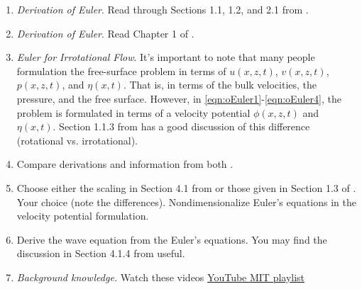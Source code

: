 \documentclass[a4paper,reqno]{article}
\begin{document}
\begin{itemize}
\begin{enumerate}
                \item \emph{Derivation of Euler}. Read through Sections 1.1, 1.2, and 2.1 from \cite{chorin1990mathematical}.   
                \item \emph{Derivation of Euler}. Read Chapter 1 of \cite{johnson1997modern}.
                \item \emph{Euler for Irrotational Flow}.  It's important to note that many people formulation the free-surface problem in terms of $u(x,z,t)$, $v(x,z,t)$, $p(x,z,t)$, and $\eta(x,t)$.  That is, in terms of the bulk velocities, the pressure, and the free surface.  However, in \eqref{eqn:oEuler1}-\eqref{eqn:oEuler4}, the problem is formulated in terms of a velocity potential $\phi(x,z,t)$ and $\eta(x,t)$.  Section 1.1.3 from \cite{johnson1997modern} has a good discussion of this difference (rotational vs. irrotational).
                \item Compare derivations and information from both \cite{chorin1990mathematical,johnson1997modern}.
                \item Choose either the scaling in Section 4.1 from \cite{deconinckNotes} or those given in Section 1.3 of \cite{johnson1997modern}.  Your choice (note the differences).  Nondimensionalize Euler's equations in the velocity potential formulation.
                \item Derive the wave equation from the Euler's equations.  You may find the discussion in Section 4.1.4 from \cite{deconinckNotes} useful.
                \item \emph{Background knowledge.} Watch these videos \href{https://www.youtube.com/playlist?list=PLfF--3o8i4r82vJ0kjCVYgqKgyVM5QwN0}{YouTube MIT playlist}
            \end{enumerate}
 

\end{itemize}
\end{document}
